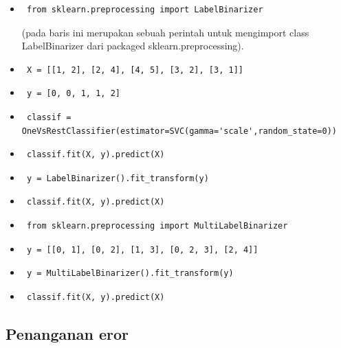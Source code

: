 \begin{enumerate}
\begin{itemize}
\item\begin{verbatim} from sklearn.preprocessing import LabelBinarizer\end{verbatim}(pada baris ini merupakan sebuah perintah untuk mengimport class LabelBinarizer dari packaged sklearn.preprocessing).
\item\begin{verbatim} X = [[1, 2], [2, 4], [4, 5], [3, 2], [3, 1]]\end{verbatim}
\item\begin{verbatim} y = [0, 0, 1, 1, 2]\end{verbatim}
\item\begin{verbatim} classif = OneVsRestClassifier(estimator=SVC(gamma='scale',random_state=0))\end{verbatim}
\item\begin{verbatim} classif.fit(X, y).predict(X)\end{verbatim}
\item\begin{verbatim} y = LabelBinarizer().fit_transform(y)\end{verbatim}
\item\begin{verbatim} classif.fit(X, y).predict(X)\end{verbatim} 
\item\begin{verbatim} from sklearn.preprocessing import MultiLabelBinarizer\end{verbatim}
\item\begin{verbatim} y = [[0, 1], [0, 2], [1, 3], [0, 2, 3], [2, 4]]\end{verbatim}
\item\begin{verbatim} y = MultiLabelBinarizer().fit_transform(y)\end{verbatim}
\item\begin{verbatim} classif.fit(X, y).predict(X)\end{verbatim} 
\end{itemize}
\end{enumerate}

\subsection{Penanganan eror}
